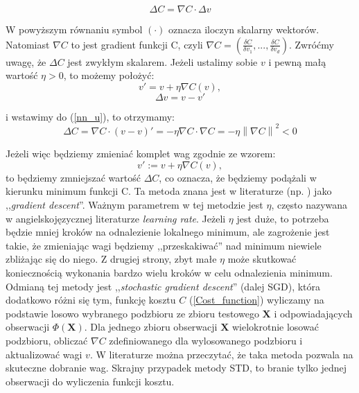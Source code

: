 \documentclass[licencjacka]{pracamgr}
\newcommand{\norm}[1]{\left\lVert#1\right\rVert}
\begin{document}
\begin{equation}
	\label{nn_u}
	\Delta C = \nabla C \cdot \Delta v
\end{equation}
 
W powyższym równaniu symbol $(\cdot)$ oznacza iloczyn skalarny wektorów. Natomiast $\nabla C$ to jest gradient funkcji C, czyli $\nabla C = (\frac{\delta C}{\delta v_{1}},...,\frac{\delta C}{\delta v_{d}} )$. Zwróćmy uwagę, że $\Delta C$ jest zwykłym skalarem. Jeżeli ustalimy sobie $v$ i pewną małą wartość $\eta>0$, to możemy położyć:
$$v' = v + \eta\nabla C(v), $$
$$ \Delta v = v - v'$$
 
i wstawimy do (\ref{nn_u}), to otrzymamy:
$$\Delta C = \nabla C\cdot (v - v)' = -\eta \nabla C\cdot\nabla C = -\eta\norm{\nabla C}^{2} < 0$$
 
Jeżeli więc będziemy zmieniać komplet wag zgodnie ze wzorem:
$$v':=v+\eta\nabla C(v),$$
to będziemy zmniejszać wartość $\Delta C$, co oznacza, że będziemy podążali w kierunku minimum funkcji C. Ta metoda znana jest w literaturze (np. \cite{nn}) jako ,,\textit{gradient descent}''. Ważnym parametrem w tej metodzie jest $\eta$, często nazywana w angielskojęzycznej literaturze \textit{learning rate}. Jeżeli $\eta$ jest duże, to potrzeba będzie mniej kroków na odnalezienie lokalnego minimum, ale zagrożenie jest takie, że zmieniając wagi będziemy ,,przeskakiwać'' nad minimum niewiele zbliżając się do niego. Z drugiej strony, zbyt małe $\eta$ może skutkować koniecznością wykonania bardzo wielu kroków w celu odnalezienia minimum. Odmianą tej metody jest ,,\textit{stochastic gradient descent}'' (dalej SGD), która dodatkowo różni się tym, funkcję kosztu $C$ (\ref{Cost_function}) wyliczamy na podstawie losowo wybranego podzbioru ze zbioru testowego $\mathbf{X}$ i odpowiadających obserwacji $\Phi(\mathbf{X})$. Dla jednego zbioru obserwacji $\mathbf{X}$ wielokrotnie losować podzbioru, obliczać $\nabla C$ zdefiniowanego dla wylosowanego podzbioru i aktualizować wagi $v$. W literaturze można przeczytać, że taka metoda pozwala na skuteczne dobranie wag. Skrajny przypadek metody STD, to branie tylko jednej obserwacji do wyliczenia funkcji kosztu.\\
 
\end{document}

